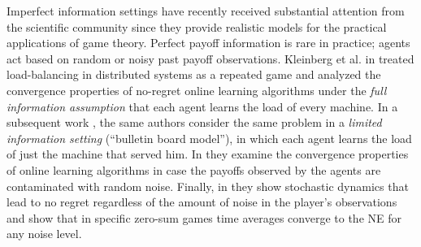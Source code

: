 Imperfect information settings have recently received substantial attention
from the scientific community since they provide realistic models for the
practical applications of game theory.  Perfect payoff information is rare in
practice; agents act based on random or noisy past payoff observations.
Kleinberg et al. in \cite{KPT09} treated load-balancing in distributed systems
as a repeated game and analyzed the convergence properties of no-regret online
learning algorithms under the \emph{full information assumption} that each
agent learns the load of every machine.  In a subsequent work \cite{KPT11}, the
same authors consider the same problem in a \emph{limited information setting}
(\enquote{bulletin board model}), in which each agent learns the load of just
the machine that served him. In \cite{HCM17,MS17} they examine the convergence
properties of online learning algorithms in case the payoffs observed by the
agents are contaminated with random noise.  Finally, in \cite{BM17} they show
stochastic dynamics that lead to no regret regardless of the amount of noise in
the player's observations and show that in specific zero-sum games time
averages converge to the NE for any noise level.
